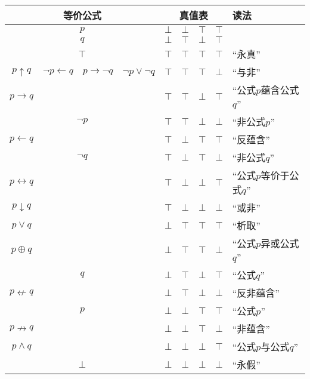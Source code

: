 \begin{table}[h!]
	\centering
	\newcommand{\T}{\color{blue}$\top$}
	\newcommand{\F}{\color{red}$\bot$}
	\begin{tabular}{c c c c c c c c l}
		\multicolumn{4}{c}{等价公式} & \multicolumn{4}{c}{真值表} & 读法 \\
		\hline
		\multicolumn{4}{c}{$p$\qquad}                                                                      & \F & \F & \T & \T & \\
		\multicolumn{4}{c}{\qquad$q$}                                                                      & \F & \T & \F & \T & \\
		\hline
		\multicolumn{4}{c}{$\top$}                                                                         & \T & \T & \T & \T & ``永真'' \\
		$p\uparrow{}q$        & $\lnot{}p\leftarrow{}q$ &  $p\rightarrow\lnot{}q$ & $\lnot{}p\lor\lnot{}q$ & \T & \T & \T & \F & ``与非'' \\
		$p\rightarrow{}q$     &&&& \T & \T & \F & \T & ``公式$p$蕴含公式$q$'' \\
		\multicolumn{4}{c}{$\lnot{}p$}                                                                     & \T & \T & \F & \F & ``非公式$p$'' \\
		$p\leftarrow{}q$      &&&& \T & \F & \T & \T & ``反蕴含'' \\
		\multicolumn{4}{c}{$\lnot{}q$}                                                                     & \T & \F & \T & \F & ``非公式$q$'' \\
		$p\leftrightarrow{}q$ &&&& \T & \F & \F & \T & ``公式$p$等价于公式$q$'' \\
		$p\downarrow{}q$      &&&& \T & \F & \F & \F & ``或非'' \\
		$p\lor{}q$            &&&& \F & \T & \T & \T & ``析取'' \\
		$p\oplus{}q$          &&&& \F & \T & \T & \F & ``公式$p$异或公式$q$'' \\
		\multicolumn{4}{c}{$q$}                                                                            & \F & \T & \F & \T & ``公式$q$'' \\
		$p\nleftarrow{}q$     &&&& \F & \T & \F & \F & ``反非蕴含'' \\
		\multicolumn{4}{c}{$p$}                                                                            & \F & \F & \T & \T & ``公式$p$'' \\
		$p\nrightarrow{}q$    &&&& \F & \F & \T & \F & ``非蕴含'' \\
		$p\land{}q$           &&&& \F & \F & \F & \T & ``公式$p$与公式$q$'' \\
		\multicolumn{4}{c}{$\bot$}                                                                         & \F & \F & \F & \F & ``永假'' \\
	\end{tabular}
\end{table}


